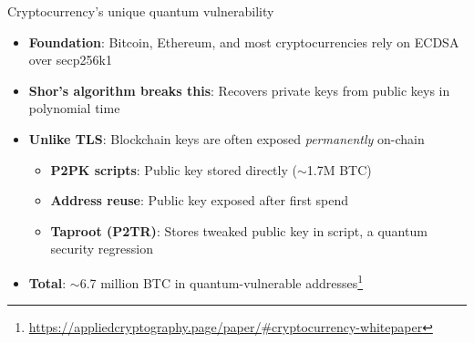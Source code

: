 \ifdefined\PRESENTATION\else\PassOptionsToClass{handout}{beamer}\fi\documentclass[aspectratio=169, lualatex]{beamer}
\begin{document}
\begin{frame}{Cryptocurrency's unique quantum vulnerability}
	\begin{itemize}
		\item \textbf{Foundation}: Bitcoin, Ethereum, and most cryptocurrencies rely on ECDSA over secp256k1
		\item \textbf{Shor's algorithm breaks this}: Recovers private keys from public keys in polynomial time
		\item \textbf{Unlike TLS}: Blockchain keys are often exposed \textit{permanently} on-chain
		      \begin{itemize}
			      \item \textbf{P2PK scripts}: Public key stored directly ($\sim$1.7M BTC)
			      \item \textbf{Address reuse}: Public key exposed after first spend
			      \item \textbf{Taproot (P2TR)}: Stores tweaked public key in script, a quantum security regression
		      \end{itemize}
		\item \textbf{Total}: $\sim$6.7 million BTC in quantum-vulnerable addresses\footnote{\url{https://appliedcryptography.page/paper/\#cryptocurrency-whitepaper}}
	\end{itemize}
\end{frame}
\end{document}
